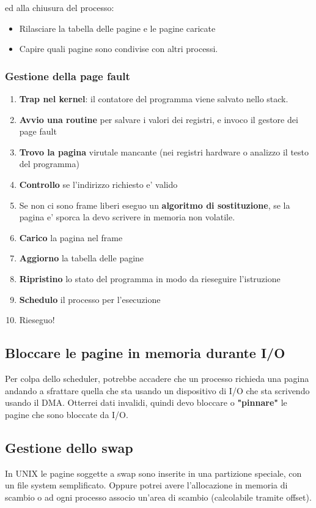 ed alla chiusura del processo:
\begin{itemize}
    \item Rilasciare la tabella delle pagine e le pagine caricate
    \item Capire quali pagine sono condivise con altri processi.
\end{itemize}

\subsubsection{Gestione della page fault}
\begin{enumerate}
    \item \textbf{Trap nel kernel}: il contatore del programma viene salvato nello stack.
    \item \textbf{Avvio una routine} per salvare i valori dei registri, e invoco il gestore dei page fault
    \item \textbf{Trovo la pagina} virutale mancante (nei registri hardware o analizzo il testo del programma)
    \item \textbf{Controllo} se l'indirizzo richiesto e' valido
    \item Se non ci sono frame liberi eseguo un \textbf{algoritmo di sostituzione}, se la pagina e' sporca la devo scrivere in memoria non volatile.
    \item \textbf{Carico} la pagina nel frame
    \item \textbf{Aggiorno} la tabella delle pagine
    \item \textbf{Ripristino} lo stato del programma in modo da rieseguire l'istruzione
    \item \textbf{Schedulo} il processo per l'esecuzione
    \item Rieseguo!
\end{enumerate}

\subsection{Bloccare le pagine in memoria durante I/O}
Per colpa dello scheduler, potrebbe accadere che un processo richieda una pagina andando a sfrattare 
quella che sta usando un dispositivo di I/O che sta scrivendo usando il DMA. Otterrei dati invalidi, quindi
devo bloccare o \textbf{"pinnare"} le pagine che sono bloccate da I/O.

\subsection{Gestione dello swap}
In UNIX le pagine soggette a swap sono inserite in una partizione speciale, con un file system semplificato.
Oppure potrei avere l'allocazione in memoria di scambio o ad ogni processo associo un'area di scambio (calcolabile tramite offset).

